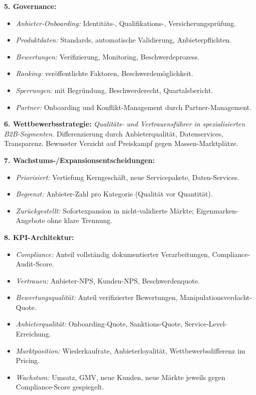 \documentclass[11pt,a4paper,oneside]{article}
\begin{document}
\begin{loesungbox}
\textbf{5. Governance:}
\begin{itemize}
  \item \emph{Anbieter-Onboarding:} Identitäts-, Qualifikations-, Versicherungsprüfung.
  \item \emph{Produktdaten:} Standards, automatische Validierung, Anbieterpflichten.
  \item \emph{Bewertungen:} Verifizierung, Monitoring, Beschwerdeprozess.
  \item \emph{Ranking:} veröffentlichte Faktoren, Beschwerdemöglichkeit.
  \item \emph{Sperrungen:} mit Begründung, Beschwerderecht, Quartalsbericht.
  \item \emph{Partner:} Onboarding und Konflikt-Management durch Partner-Management.
\end{itemize}

\textbf{6. Wettbewerbsstrategie:}
\emph{Qualitäts- und Vertrauensführer in spezialisierten B2B-Segmenten.} Differenzierung durch Anbieterqualität, Datenservices, Transparenz. Bewusster Verzicht auf Preiskampf gegen Massen-Marktplätze.

\smallskip
\textbf{7. Wachstums-/Expansionsentscheidungen:}
\begin{itemize}
  \item \emph{Priorisiert:} Vertiefung Kerngeschäft, neue Servicepakete, Daten-Services.
  \item \emph{Begrenzt:} Anbieter-Zahl pro Kategorie (Qualität vor Quantität).
  \item \emph{Zurückgestellt:} Sofortexpansion in nicht-validierte Märkte; Eigenmarken-Angebote ohne klare Trennung.
\end{itemize}

\textbf{8. KPI-Architektur:}
\begin{itemize}
  \item \emph{Compliance:} Anteil vollständig dokumentierter Verarbeitungen, Compliance-Audit-Score.
  \item \emph{Vertrauen:} Anbieter-NPS, Kunden-NPS, Beschwerdenquote.
  \item \emph{Bewertungsqualität:} Anteil verifizierter Bewertungen, Manipulationsverdacht-Quote.
  \item \emph{Anbieterqualität:} Onboarding-Quote, Sanktions-Quote, Service-Level-Erreichung.
  \item \emph{Marktposition:} Wiederkaufrate, Anbieterloyalität, Wettbewerbsdifferenz im Pricing.
  \item \emph{Wachstum:} Umsatz, GMV, neue Kunden, neue Märkte \textendash{} jeweils gegen Compliance-Score gespiegelt.
\end{itemize}


\end{loesungbox}
\end{document}

